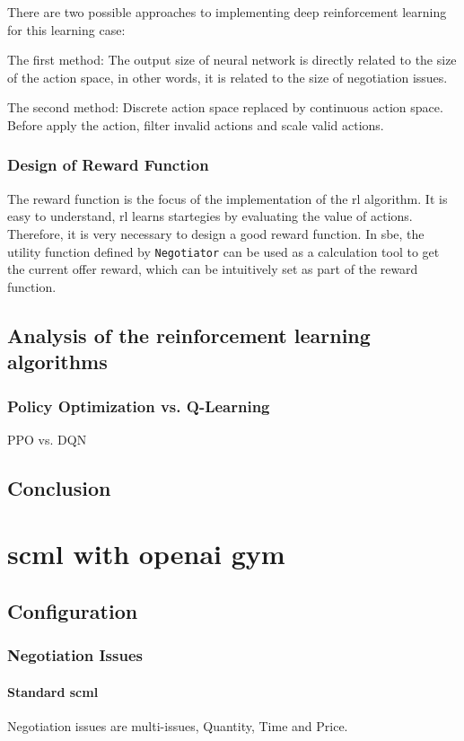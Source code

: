 There are two possible approaches to implementing deep reinforcement learning for this learning case:

The first method: The output size of neural network is directly related to the size of the action space, in other words, it is related to the size of negotiation issues. 

The second method: Discrete action space replaced by continuous action space. Before apply the action, filter invalid actions and scale valid actions.

\subsubsection{Design of Reward Function}
The reward function is the focus of the implementation of the \gls{rl} algorithm. It is easy to understand, \gls{rl} learns startegies by evaluating the value of actions. Therefore, it is very necessary to design a good reward function. In \gls{sbe}, the utility function defined by \texttt{Negotiator} can be used as a calculation tool to get the current offer reward, which can be intuitively set as part of the reward function.  

\subsection{Analysis of the reinforcement learning algorithms}
\subsubsection{Policy Optimization vs. Q-Learning}
PPO vs. DQN

\subsection{Conclusion}


\section{\gls{scml} with \gls{openai gym}}
\subsection{Configuration}
\subsubsection{Negotiation Issues}
\paragraph{Standard \gls{scml}} Negotiation issues are multi-issues, Quantity, Time and Price. 
